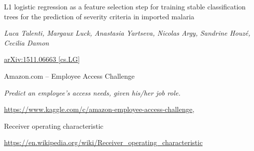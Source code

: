 \documentclass[11pt]{article}
\begin{document}
\begin{thebibliography}{9}

    L1 logistic regression as a feature selection step for training stable 
    classification trees for the prediction of severity criteria in imported malaria

    \textit{Luca Talenti, Margaux Luck, Anastasia Yartseva, Nicolas Argy, Sandrine Houzé, Cecilia Damon}

    \href{https://arxiv.org/abs/1511.06663}{arXiv:1511.06663 [cs.LG]}

    Amazon.com -- Employee Access Challenge 

    \textit{Predict an employee's access needs, given his/her job role.}

    \href{https://www.kaggle.com/c/amazon-employee-access-challenge}
    {https://www.kaggle.com/c/amazon-employee-access-challenge},


    Receiver operating characteristic 

    \href{https://en.wikipedia.org/wiki/Receiver_operating_characteristic}
    {https://en.wikipedia.org/wiki/Receiver\_operating\_characteristic}

\end{thebibliography}
\end{document}
